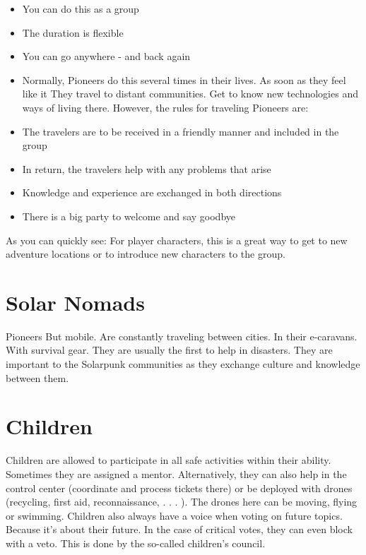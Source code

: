 \begin{itemize}
    \item You can do this as a group
    \item The duration is flexible
    \item You can go anywhere - and back again
    \item Normally, Pioneers do this several times in their lives. As soon as they feel like it They travel to distant communities. Get to know new technologies and ways of living there. However, the rules for traveling Pioneers are:
    \item The travelers are to be received in a friendly manner and included in the group
    \item In return, the travelers help with any problems that arise
    \item Knowledge and experience are exchanged in both directions
    \item There is a big party to welcome and say goodbye
\end{itemize}

As you can quickly see: For player characters, this is a great way to get to new adventure locations or to introduce new characters to the group.

\section{Solar Nomads}
Pioneers But mobile. Are constantly traveling between cities. In their e-caravans. With survival gear. They are usually the first to help in disasters. They are important to the Solarpunk communities as they exchange culture and knowledge between them.


\section{Children}
Children are allowed to participate in all safe activities within their ability. Sometimes they are assigned a mentor. Alternatively, they can also help in the control center (coordinate and process tickets there) or be deployed with drones (recycling, first aid, reconnaissance, . . . ). The drones here can be moving, flying or swimming.
Children also always have a voice when voting on future topics. Because it's about their future.
In the case of critical votes, they can even block with a veto. This is done by the so-called children's council.

